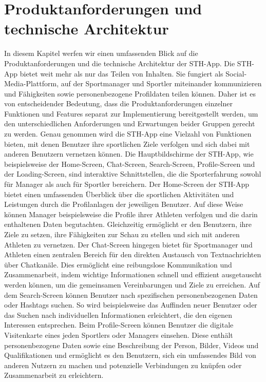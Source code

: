 \newpage
\chapter{Produktanforderungen und technische Architektur}

In diesem Kapitel werfen wir einen umfassenden Blick auf die Produktanforderungen und die technische Architektur der STH-App.
Die STH-App bietet weit mehr als nur das Teilen von Inhalten. Sie fungiert als Social-Media-Plattform, auf der Sportmanager und Sportler miteinander kommunizieren und Fähigkeiten sowie personenbezogene Profildaten teilen können. Daher ist es von entscheidender Bedeutung, dass die Produktanforderungen einzelner Funktionen und Features separat zur Implementierung bereitgestellt werden, um den unterschiedlichen Anforderungen und Erwartungen beider Gruppen gerecht zu werden.
Genau genommen wird die STH-App eine Vielzahl von Funktionen bieten, mit denen Benutzer ihre sportlichen Ziele verfolgen und sich dabei mit anderen Benutzern vernetzen können.
Die Hauptbildschirme der STH-App, wie beispielsweise der Home-Screen, Chat-Screen, Search-Screen, Profile-Screen und der Loading-Screen, sind interaktive Schnittstellen, die die Sporterfahrung sowohl für Manager als auch für Sportler bereichern.
Der Home-Screen der STH-App bietet einen umfassenden Überblick über die sportlichen Aktivitäten und Leistungen durch die Profilanlagen der jeweiligen Benutzer. Auf diese Weise können Manager beispielsweise die Profile ihrer Athleten verfolgen und die darin enthaltenen Daten begutachten. Gleichzeitig ermöglicht er den Benutzern, ihre Ziele zu setzen, ihre Fähigkeiten zur Schau zu stellen und sich mit anderen Athleten zu vernetzen.
Der Chat-Screen hingegen bietet für Sportmanager und Athleten einen zentralen Bereich für den direkten Austausch von Textnachrichten über Chatkanäle. Dies ermöglicht eine reibungslose Kommunikation und Zusammenarbeit, indem wichtige Informationen schnell und effizient ausgetauscht werden können, um die gemeinsamen Vereinbarungen und Ziele zu erreichen.
Auf dem Search-Screen können Benutzer nach spezifischen personenbezogenen Daten oder Hashtags suchen. So wird beispielsweise das Auffinden neuer Benutzer oder das Suchen nach individuellen Informationen erleichtert, die den eigenen Interessen entsprechen.
Beim Profile-Screen können Benutzer die digitale Visitenkarte eines jeden Sportlers oder Managers einsehen. Diese enthält personenbezogene Daten sowie eine Beschreibung der Person, Bilder, Videos und Qualifikationen und ermöglicht es den Benutzern, sich ein umfassendes Bild von anderen Nutzern zu machen und potenzielle Verbindungen zu knüpfen oder Zusammenarbeit zu erleichtern.
